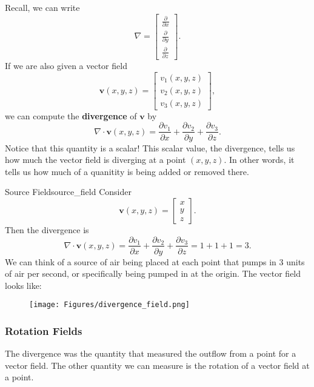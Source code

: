         Recall, we can write
        \[
        \nabla = \begin{bmatrix} \frac{\partial}{\partial x} \\ \frac{\partial}{\partial y} \\ \frac{\partial}{\partial z} \end{bmatrix}.
        \]
        If we are also given a vector field
        \[
        \mathbf{v}(x,y,z) = \begin{bmatrix} v_1(x,y,z) \\ v_2(x,y,z) \\ v_3(x,y,z) \end{bmatrix},
        \]
        we can compute the \textbf{divergence} of $\mathbf{v}$ by
        \[
        \nabla \cdot \mathbf{v}(x,y,z) = \frac{\partial v_1}{\partial x} + \frac{\partial v_2}{\partial y} + \frac{\partial v_3}{\partial z}.
        \]
        Notice that this quantity is a scalar!  This scalar value, the divergence, tells us how much the vector field is diverging at a point $(x,y,z)$. In other words, it tells us how much of a quanitity is being added or removed there.
        
        \begin{ex}{Source Field}{source_field}
        Consider
        \[
        \mathbf{v}(x,y,z) = \begin{bmatrix} x \\ y \\ z \end{bmatrix}.
        \]
        Then the divergence is
        \[
        \nabla \cdot \mathbf{v}(x,y,z) = \frac{\partial v_1}{\partial x} + \frac{\partial v_2}{\partial y} + \frac{\partial v_3}{\partial z} = 1 + 1 + 1 = 3.
        \]
        We can think of a source of air being placed at each point that pumps in $3$ units of air per second, or specifically being pumped in at the origin. The vector field looks like:
        \begin{figure}[H]
            \centering
            \texttt{[image: Figures/divergence\_field.png]}
        \end{figure}
        \end{ex}
        
        \subsubsection{Rotation Fields}
        The divergence was the quantity that measured the outflow from a point for a vector field.  The other quantity we can measure is the rotation of a vector field at a point.
        

